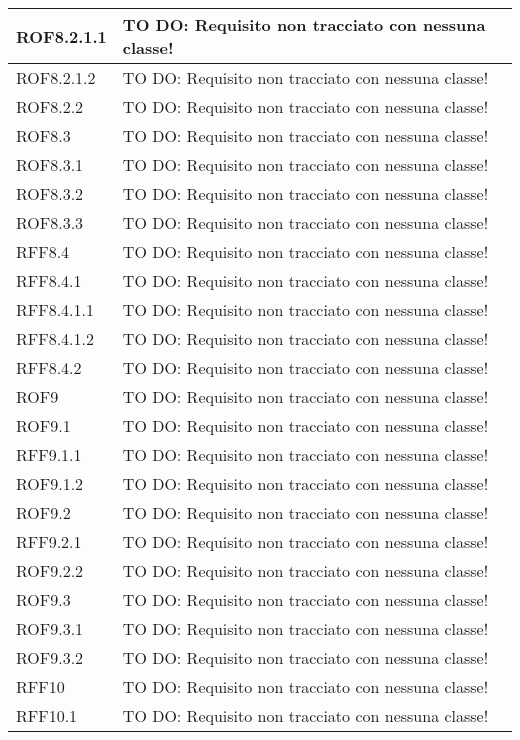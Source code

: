 \begin{center}
\begin{longtable}{| p{2.5cm} | p{11cm} |}
ROF8.2.1.1 & TO DO: Requisito non tracciato con nessuna classe! \\
\hline
ROF8.2.1.2 & TO DO: Requisito non tracciato con nessuna classe! \\
\hline
ROF8.2.2 & TO DO: Requisito non tracciato con nessuna classe! \\
\hline
ROF8.3 & TO DO: Requisito non tracciato con nessuna classe! \\
\hline
ROF8.3.1 & TO DO: Requisito non tracciato con nessuna classe! \\
\hline
ROF8.3.2 & TO DO: Requisito non tracciato con nessuna classe! \\
\hline
ROF8.3.3 & TO DO: Requisito non tracciato con nessuna classe! \\
\hline
RFF8.4 & TO DO: Requisito non tracciato con nessuna classe! \\
\hline
RFF8.4.1 & TO DO: Requisito non tracciato con nessuna classe! \\
\hline
RFF8.4.1.1 & TO DO: Requisito non tracciato con nessuna classe! \\
\hline
RFF8.4.1.2 & TO DO: Requisito non tracciato con nessuna classe! \\
\hline
RFF8.4.2 & TO DO: Requisito non tracciato con nessuna classe! \\
\hline
ROF9 & TO DO: Requisito non tracciato con nessuna classe! \\
\hline
ROF9.1 & TO DO: Requisito non tracciato con nessuna classe! \\
\hline
RFF9.1.1 & TO DO: Requisito non tracciato con nessuna classe! \\
\hline
ROF9.1.2 & TO DO: Requisito non tracciato con nessuna classe! \\
\hline
ROF9.2 & TO DO: Requisito non tracciato con nessuna classe! \\
\hline
RFF9.2.1 & TO DO: Requisito non tracciato con nessuna classe! \\
\hline
ROF9.2.2 & TO DO: Requisito non tracciato con nessuna classe! \\
\hline
ROF9.3 & TO DO: Requisito non tracciato con nessuna classe! \\
\hline
ROF9.3.1 & TO DO: Requisito non tracciato con nessuna classe! \\
\hline
ROF9.3.2 & TO DO: Requisito non tracciato con nessuna classe! \\
\hline
RFF10 & TO DO: Requisito non tracciato con nessuna classe! \\
\hline
RFF10.1 & TO DO: Requisito non tracciato con nessuna classe! \\

\end{longtable}
\end{center}
